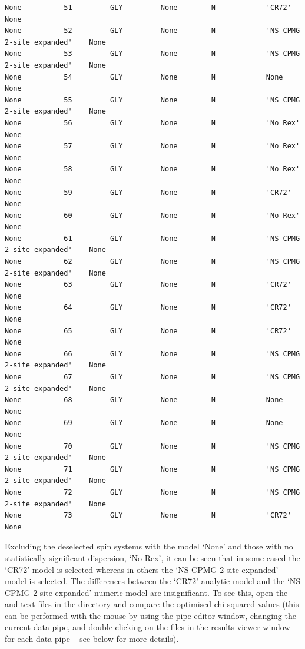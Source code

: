 \begin{lstlisting}[basicstyle=\ttfamily \scriptsize,numbers=none]
None          51         GLY         None        N            'CR72'                       None     
None          52         GLY         None        N            'NS CPMG 2-site expanded'    None     
None          53         GLY         None        N            'NS CPMG 2-site expanded'    None     
None          54         GLY         None        N            None                         None     
None          55         GLY         None        N            'NS CPMG 2-site expanded'    None     
None          56         GLY         None        N            'No Rex'                     None     
None          57         GLY         None        N            'No Rex'                     None     
None          58         GLY         None        N            'No Rex'                     None     
None          59         GLY         None        N            'CR72'                       None     
None          60         GLY         None        N            'No Rex'                     None     
None          61         GLY         None        N            'NS CPMG 2-site expanded'    None     
None          62         GLY         None        N            'NS CPMG 2-site expanded'    None     
None          63         GLY         None        N            'CR72'                       None     
None          64         GLY         None        N            'CR72'                       None     
None          65         GLY         None        N            'CR72'                       None     
None          66         GLY         None        N            'NS CPMG 2-site expanded'    None     
None          67         GLY         None        N            'NS CPMG 2-site expanded'    None     
None          68         GLY         None        N            None                         None     
None          69         GLY         None        N            None                         None     
None          70         GLY         None        N            'NS CPMG 2-site expanded'    None     
None          71         GLY         None        N            'NS CPMG 2-site expanded'    None     
None          72         GLY         None        N            'NS CPMG 2-site expanded'    None     
None          73         GLY         None        N            'CR72'                       None     
\end{lstlisting}

Excluding the deselected spin systems with the model `None' and those with no statistically significant dispersion, `No Rex', it can be seen that in some cased the `CR72' model is selected whereas in others the `NS CPMG 2-site expanded' model is selected.
The differences between the `CR72' analytic model and the `NS CPMG 2-site expanded' numeric model are insignificant.
To see this, open the  and  text files in the  directory and compare the optimised chi-squared values (this can be performed with the mouse by using the pipe editor window, changing the current data pipe, and double clicking on the files in the results viewer window for each data pipe -- see below for more details).

